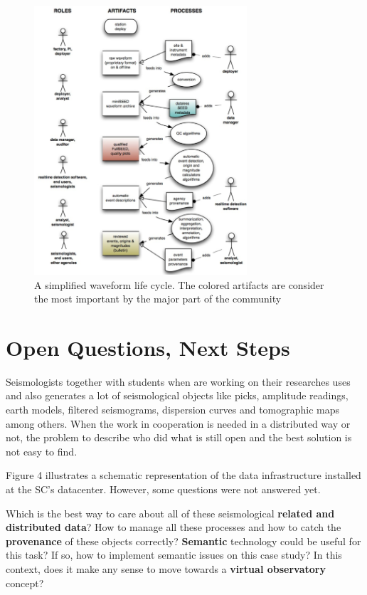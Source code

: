 \documentclass[twoside,letterpaper,twocolumn]{article}
\begin{document}
\begin{figure}[ht!]
\centering
\includegraphics[height=10cm]{images/dataSteps.png}
\caption[Figure 3]{A simplified waveform life cycle. The colored artifacts are consider the most important by the major part of the community}
\end{figure}

\section{Open Questions, Next Steps}

Seismologists together with students when are working on their researches uses and also generates a lot of seismological objects like picks, amplitude readings, earth models, filtered seismograms, dispersion curves and tomographic maps among others. When the work in cooperation is needed in a distributed way or not, the problem to describe who did what is still open and the best solution is not easy to find. 

Figure 4 illustrates a schematic representation of the data infrastructure installed at the SC's datacenter. However, some questions were not answered yet.

Which is the best way to care about all of these seismological \textbf {related and distributed data}? How to manage all these processes and how to catch the \textbf {provenance} of these objects correctly? \textbf {Semantic} technology could be useful for this task? If so, how to implement semantic issues on this case study? In this context, does it make any sense to move towards a \textbf {virtual observatory} concept?
\end{document}
